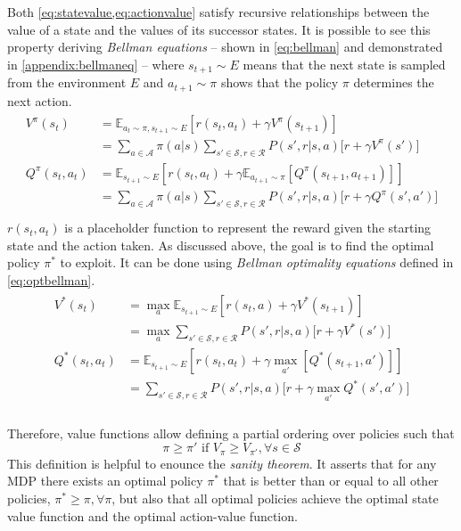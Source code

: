 Both \vref{eq:statevalue,eq:actionvalue} satisfy recursive relationships between the value of a state and the values of its successor states. It is possible to see this property deriving \textit{Bellman equations} \cite{bellman2015applied} -- shown in \vref{eq:bellman} and demonstrated in \vref{appendix:bellmaneq} -- where $s_{t+1}\sim \mathit{E}$ means that the next state is sampled from the environment $E$ and $a_{t+1}\sim \pi$ shows that the policy $\pi$ determines the next action.
\begin{align} \label{eq:bellman}
	\begin{split}
V^\pi(s_t) &= \mathbb{E}_{a_t \sim \pi, s_{t+1} \sim E}[r(s_t, a_t) + \gamma V^\pi(s_{t+1})] \\
		&= \sum_{a \in \mathcal{A}}\pi(a|s)\sum_{s' \in \mathcal{S}, r \in \mathcal{R}}P(s', r | s, a)\big[r + \gamma V^\pi(s')\big]\\
Q^\pi(s_t,a_t) &= \mathbb{E}_{s_{t+1} \sim E}[r(s_t, a_t) + \gamma \mathbb{E}_{ a_{t+1} \sim \pi}[Q^\pi(s_{t+1}, a_{t+1})]]\\
	&= \sum_{a \in \mathcal{A}}\pi(a|s)\sum_{s' \in \mathcal{S}, r \in \mathcal{R}}P(s', r | s, a)\big[r + \gamma Q^\pi(s',a')\big]\\
\end{split}
\end{align}
 $r(s_t, a_t)$ is a placeholder function to represent the reward given the starting state and the action taken.
As discussed above, the goal is to find the optimal policy $\pi^*$ to exploit. It can be done using \textit{Bellman optimality equations} defined in \vref{eq:optbellman}. 
\begin{align} \label{eq:optbellman}
\begin{split}
V^*(s_t) &= \max_{a} \mathbb{E}_{s_{t+1} \sim E}[r(s_t, a) + \gamma V^*(s_{t+1})] \\
		&= \max_{a}\sum_{s' \in \mathcal{S}, r \in \mathcal{R}}P(s', r | s, a)\big[r + \gamma V^*(s')\big]\\
Q^*(s_t,a_t) &= \mathbb{E}_{s_{t+1} \sim E}[r(s_t, a_t) + \gamma \max_{a'}[Q^*(s_{t+1}, a')]]\\
			&= \sum_{s' \in \mathcal{S}, r \in \mathcal{R}}P(s', r | s, a)\big[r + \gamma \max_{a'} Q^*(s',a')\big]\\
\end{split}
\end{align}

Therefore, value functions allow defining a partial ordering over policies such that \[\pi \ge \pi' \text{ if } V_\pi \ge V_{\pi'},\forall s \in \mathcal{S}\]
This definition is helpful to enounce the \textit{sanity theorem}. It asserts that for any MDP there exists an optimal policy $\pi^*$ that is better than or equal to all other policies, $\pi^* \ge \pi, \forall \pi$, but also that all optimal policies achieve the optimal state value function and the optimal action-value function.

